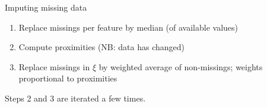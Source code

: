 \documentclass[11pt,compress,t,notes=noshow, xcolor=table]{beamer}
\begin{document}
\begin{frame}{Imputing missing data}
\begin{center}
\end{center}
\begin{enumerate}
\item Replace missings per feature by median (of available values)
\item Compute proximities (NB: data has changed)
\item Replace missings in $\xi$ by weighted average of non-missings; weights proportional to proximities
\end{enumerate}

\lz

Steps 2 and 3 are iterated a few times. %
\end{frame}

\endlecture
\end{document}
